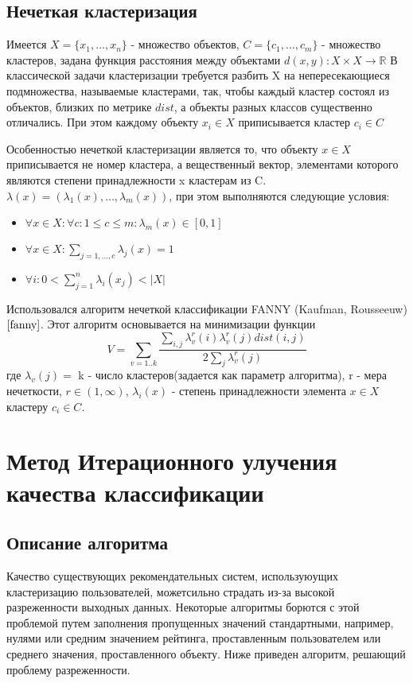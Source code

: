 \documentclass[12pt]{article} %
\begin{document}
\subsection{Нечеткая кластеризация}
Имеется $X=\{x_{1},\dots,x_{n}\}$ - множество объектов, $C=\{c_{1},\dots,c_{m}\}$ - множество кластеров, задана функция расстояния между объектами $d(x, y): X\times X  \to \mathbb{R}$ В классической задачи кластеризации требуется разбить X на непересекающиеся подмножества, называемые кластерами, так, чтобы каждый кластер состоял из объектов, близких по метрике $dist$, а объекты разных классов существенно отличались. При этом каждому объекту $x_{i} \in X$ приписывается кластер $c_{i} \in C$
\par
 Особенностью нечеткой кластеризации является то, что объекту $x \in X$ приписывается не номер кластера, а вещественный вектор, элементами которого являются степени принадлежности x кластерам из C. $\lambda(x)=(\lambda_{1}(x),\dots,\lambda_{m}(x)) $, при этом выполняются следующие условия:
 \begin{itemize}
 \item $\forall x \in X: \forall c: 1\leq c \leq m:  \lambda_{m}(x) \in [0,1]$
 \item $\forall x \in X: \sum_{j=1,\dots,c} \lambda_{j}(x) = 1$
 \item $\forall i : 0 < \sum_{j=1}^{n} \lambda_{i}(x_{j}) < |X|  $
 \end{itemize} 
 \par
 Использовался алгоритм нечеткой классификации FANNY (Kaufman, Rousseeuw)$\cite{fanny}$. Этот алгоритм основывается на минимизации функции 
\[
	V=\sum_{v=1..k} \frac{\sum_{i,j} \lambda_{v}^r(i) \lambda_{v}^r(j) dist(i,j)}{2 \sum_{j} \lambda_{v}^r(j)}
\]
где $\lambda_{v}(j) = $ k - число кластеров(задается как параметр алгоритма), r - мера нечеткости, $r \in (1, \infty)$, $\lambda_{i}(x)$ - степень принадлежности элемента $x \in X$ кластеру $c_{i} \in C$.


\section{Метод Итерационного улучения качества классификации}
\subsection{Описание алгоритма}
Качество существующих рекомендательных систем, используюущих кластеризацию пользователей, можетсильно страдать из-за высокой разреженности выходных данных. Некоторые алгоритмы борются с этой проблемой путем заполнения пропущенных значений стандартными, например, нулями или средним значением рейтинга, проставленным пользователем или среднего значения, проставленного объекту. Ниже приведен алгоритм, решающий проблему разреженности.
\end{document}
